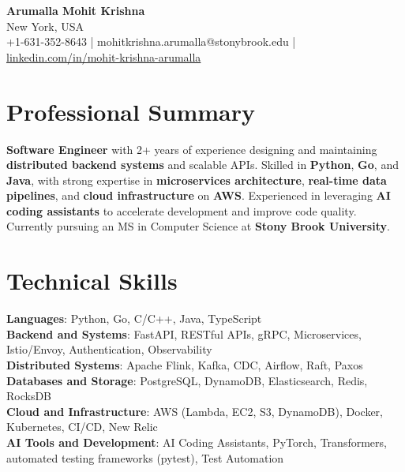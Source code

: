 \documentclass[letterpaper,11pt]{article}
\begin{document}
\begin{center}
  {\Large \textbf{Arumalla Mohit Krishna}} \\
  New York, USA \\
  +1-631-352-8643 \enspace | \enspace mohitkrishna.arumalla@stonybrook.edu \enspace | \enspace \href{https://www.linkedin.com/in/mohit-krishna-arumalla}{linkedin.com/in/mohit-krishna-arumalla}
\end{center}

\section{Professional Summary}
  \begin{itemize}[leftmargin=0.15in, label={}]
    \small{\item{
     \textbf{Software Engineer} with 2+ years of experience designing and maintaining \textbf{distributed backend systems} and scalable APIs. Skilled in \textbf{Python}, \textbf{Go}, and \textbf{Java}, with strong expertise in \textbf{microservices architecture}, \textbf{real-time data pipelines}, and \textbf{cloud infrastructure} on \textbf{AWS}. Experienced in leveraging \textbf{AI coding assistants} to accelerate development and improve code quality. Currently pursuing an MS in Computer Science at \textbf{Stony Brook University}.
    }}
  \end{itemize}
\vspace{-16pt}

\section{Technical Skills}
 \begin{itemize}[leftmargin=0.15in, label={}]
    \small{\item{
     \textbf{Languages}: Python, Go, C/C++, Java, TypeScript \\
     \textbf{Backend and Systems}: FastAPI, RESTful APIs, gRPC, Microservices, Istio/Envoy, Authentication, Observability \\
     \textbf{Distributed Systems}: Apache Flink, Kafka, CDC, Airflow, Raft, Paxos \\
     \textbf{Databases and Storage}: PostgreSQL, DynamoDB, Elasticsearch, Redis, RocksDB \\
     \textbf{Cloud and Infrastructure}: AWS (Lambda, EC2, S3, DynamoDB), Docker, Kubernetes, CI/CD, New Relic \\
     \textbf{AI Tools and Development}: AI Coding Assistants, PyTorch, Transformers, automated testing frameworks (pytest), Test Automation \\
    }}
 \end{itemize}
\vspace{-16pt}
\end{document}
